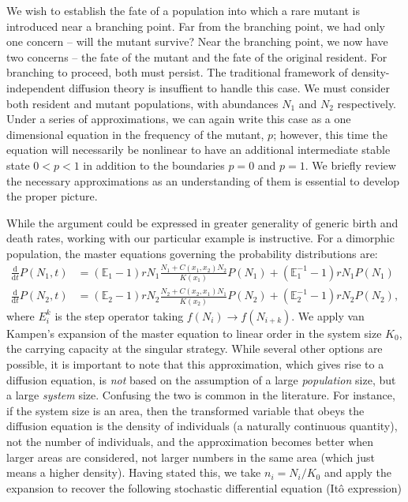 \documentclass[letterpaper,10pt]{article}
\title{}
\author{Carl Boettiger}
\newcommand{\ud}{\mathrm{d}}
\newcommand{\E}{\mathbb{E}}
\begin{document}
\maketitle
We wish to establish the fate of a population into which a rare mutant is introduced near a branching point.  Far from the branching point, we had only one concern -- will the mutant survive?  Near the branching point, we now have two concerns -- the fate of the mutant and the fate of the original resident.  For branching to proceed, both must persist.  The traditional framework of density-independent diffusion theory is insuffient to handle this case.  We must consider both resident and mutant populations, with abundances $N_1$ and $N_2$ respectively.  Under a series of approximations, we can again write this case as a one dimensional equation in the frequency of the mutant, $p$; however, this time the equation will necessarily be nonlinear to have an additional intermediate stable state $0<p<1$ in addition to the boundaries $p=0$ and $p=1$.  We briefly review the necessary approximations as an understanding of them is essential to develop the proper picture.   

While the argument could be expressed in greater generality of generic birth and death rates, working with our particular example is instructive.  For a dimorphic population, the master equations governing the probability distributions are:
\begin{align}
\frac{\ud}{\ud t} P(N_1,t) &= (\E_1 - 1) r N_1 \frac{N_1 + C(x_1, x_2) N_2}{K(x_1) }P(N_1) + (\E_1^{-1} - 1)r N_1 P(N_1) \nonumber \\
\frac{\ud}{\ud t} P(N_2,t) &= (\E_2 - 1) r N_2 \frac{N_2 + C(x_2, x_1) N_1}{K(x_2) }P(N_2) + (\E_2^{-1} - 1)r N_2 P(N_2),
\label{mastereq}
\end{align}
where $E_i^k$ is the step operator taking $f(N_i) \to f(N_{i+k})$.  We apply van Kampen's expansion of the master equation to linear order in the system size $K_0$, the carrying capacity at the singular strategy.  While several other options are possible, it is important to note that this approximation, which gives rise to a diffusion equation, is \emph{not} based on the assumption of a large \emph{population} size, but a large \emph{system} size.  Confusing the two is common in the literature.  For instance, if the system size is an area, then the transformed variable that obeys the diffusion equation is the density of individuals (a naturally continuous quantity), not the number of individuals, and the approximation becomes better when larger areas are considered, not larger numbers in the same area (which just means a higher density).  Having stated this, we take $n_i = N_i/K_0$ and apply the expansion to recover the following stochastic differential equation (It\^o expression)
\end{document}
